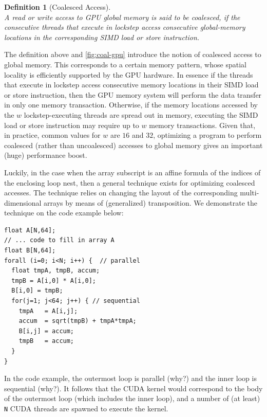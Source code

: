 \documentclass[acmsmall,review]{acmart}\settopmatter{printfolios=true,printccs=false,printacmref=false}
\newtheorem{mydef}{Definition}
\begin{document}
\begin{mydef}[Coalesced Access]\label{coalescedDef}
$\mbox{ }$\\
A read or write access to GPU global memory is said to be
coalesced, if the consecutive threads that execute in lockstep
access consecutive global-memory locations in the corresponding 
SIMD load or store instruction.
\end{mydef}

The definition above and \cref{fig:coal-gpu} introduce the notion
of coalesced access to global memory. This corresponds to a certain 
memory pattern, whose spatial locality is efficiently supported 
by the GPU hardware. In essence if the threads that execute in lockstep 
access consecutive memory locations in their SIMD load or store
instruction, then the GPU memory system will perform the data transfer
in only one memory transaction. Otherwise, if the memory locations 
accessed by the $w$ lockstep-executing threads are spread out in memory,
executing the SIMD load or store instruction may require up to $w$ memory
transactions.  Given that, in practice, common values for $w$ are $16$ and
$32$, optimizing a program to perform coalesced (rather than uncoalesced)
accesses to global memory gives an important (huge) performance boost. 

Luckily, in the case when the array subscript is an affine formula of the 
indices of the enclosing loop nest, then a general technique exists for
optimizing coalesced accesses. The technique relies on changing the 
layout of the corresponding multi-dimensional arrays by means of 
(generalized) transposition. We demonstrate the technique on the 
code example below:

\begin{lstlisting}[mathescape=true]
float A[N,64];
// ... code to fill in array A
float B[N,64];
forall (i=0; i<N; i++) {  // parallel
  float tmpA, tmpB, accum;
  tmpB = A[i,0] * A[i,0];
  B[i,0] = tmpB;
  for(j=1; j<64; j++) { // sequential
    tmpA   = A[i,j];
    accum  = sqrt(tmpB) + tmpA*tmpA;
    B[i,j] = accum;
    tmpB   = accum;
  }
}
\end{lstlisting}\vspace{-2ex}

In the code example, the outermost loop is parallel (why?) and the inner 
loop is sequential (why?). It follows that the CUDA kernel would correspond 
to the body of the outermost loop (which includes the inner loop), and a 
number of (at least) {\tt N} CUDA threads are spawned to execute the kernel.  
\end{document}
